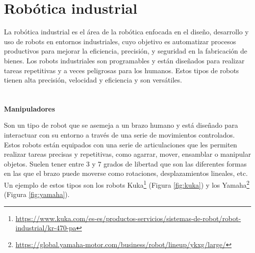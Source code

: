 \section{Robótica industrial}
\label{sec:segundaseccion}

La robótica industrial es el área de la robótica enfocada en el diseño, desarrollo y uso de robots en entornos industriales, cuyo objetivo es automatizar procesos productivos para mejorar la eficiencia, precisión, y seguridad en la fabricación de bienes. Los robots industriales son programables y están diseñados para realizar tareas repetitivas y a veces peligrosas para los humanos. Estos tipos de robots tienen alta precisión, velocidad y eficiencia y son versátiles. \\ \\ \\

\noindent\textbf{Manipuladores} 

Son un tipo de robot que se asemeja a un brazo humano y está diseñado para interactuar con su entorno a través de una serie de movimientos controlados. Estos robots están equipados con una serie de articulaciones que les permiten realizar tareas precisas y repetitivas, como agarrar, mover, ensamblar o manipular objetos. Suelen tener entre 3 y 7 grados de libertad que son las diferentes formas en las que el brazo puede moverse como rotaciones, desplazamientos lineales, etc. Un ejemplo de estos tipos son los robots Kuka\footnote{\url{https://www.kuka.com/es-es/productos-servicios/sistemas-de-robot/robot-industrial/kr-470-pa}} (Figura \ref{fig:kuka}) y los Yamaha\footnote{\url{https://global.yamaha-motor.com/business/robot/lineup/ykxg/large/}} (Figura \ref{fig:yamaha}).


